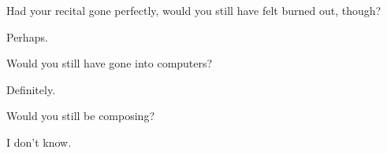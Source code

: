 \begin{paracol}{2}
\begin{leftcolumn}
\begin{ally}
Had your recital gone perfectly, would you still have felt burned out, though?
\end{ally}
Perhaps.

\begin{ally}
Would you still have gone into computers?
\end{ally}
Definitely.

\begin{ally}
Would you still be composing?
\end{ally}
I don't know.
\newpage
\end{leftcolumn}
\end{paracol}
